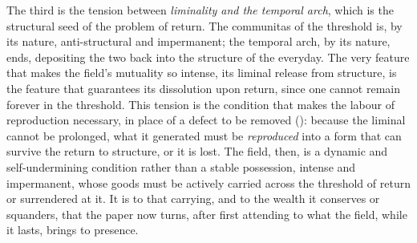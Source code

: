 The third is the tension between \emph{liminality and the temporal arch}, which is the structural seed of the problem of return. The communitas of the threshold is, by its nature, anti-structural and impermanent; the temporal arch, by its nature, ends, depositing the two back into the structure of the everyday. The very feature that makes the field's mutuality so intense, its liminal release from structure, is the feature that guarantees its dissolution upon return, since one cannot remain forever in the threshold. This tension is the condition that makes the labour of reproduction necessary, in place of a defect to be removed (): because the liminal cannot be prolonged, what it generated must be \emph{reproduced} into a form that can survive the return to structure, or it is lost. The field, then, is a dynamic and self-undermining condition rather than a stable possession, intense and impermanent, whose goods must be actively carried across the threshold of return or surrendered at it. It is to that carrying, and to the wealth it conserves or squanders, that the paper now turns, after first attending to what the field, while it lasts, brings to presence.
